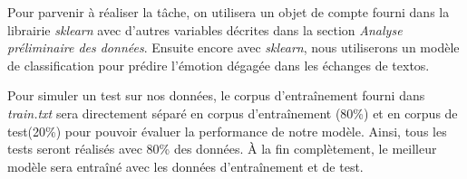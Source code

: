 Pour parvenir à réaliser la tâche, on utilisera un objet de compte fourni dans la librairie \emph{sklearn} avec d'autres variables décrites dans la section \emph{Analyse préliminaire des données}. Ensuite encore avec \emph{sklearn}, nous utiliserons un modèle de classification pour prédire l'émotion dégagée dans les échanges de textos.

Pour simuler un test sur nos données, le corpus d'entraînement fourni dans \emph{train.txt} sera directement séparé en corpus d'entraînement (80\%) et en corpus de test(20\%)  pour pouvoir évaluer la performance de notre modèle. Ainsi, tous les tests seront réalisés avec 80\% des données. À la fin complètement, le meilleur modèle sera entraîné avec les données d'entraînement et de test.